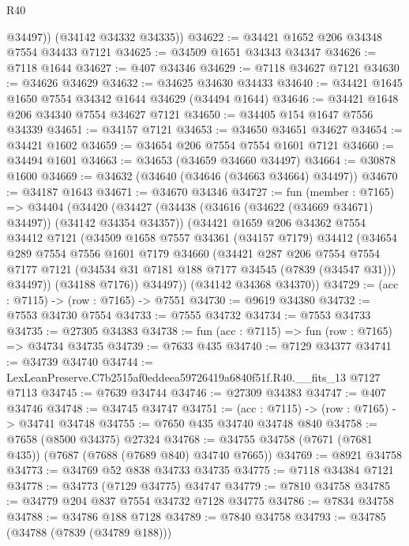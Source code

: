 \begin{lexlean}{R40}
\begin{coremodule}
          @34497))
      (@34142 @34332 @34335))
@34622 := @34421 @1652 @206 @34348 @7554 @34433 @7121
@34625 := @34509 @1651 @34343 @34347
@34626 := @7118 @1644
@34627 := @407 @34346
@34629 := @7118 @34627 @7121
@34630 := @34626 @34629
@34632 := @34625 @34630 @34433
@34640 := @34421 @1645 @1650 @7554 @34342 @1644 @34629 (@34494 @1644)
@34646 := @34421 @1648 @206 @34340 @7554 @34627 @7121
@34650 := @34405 @154 @1647 @7556 @34339
@34651 := @34157 @7121
@34653 := @34650 @34651 @34627
@34654 := @34421 @1602
@34659 := @34654 @206 @7554 @7554 @1601 @7121
@34660 := @34494 @1601
@34663 := @34653 (@34659 @34660 @34497)
@34664 := @30878 @1600
@34669 := @34632 (@34640 (@34646 (@34663 @34664) @34497))
@34670 := @34187 @1643
@34671 := @34670 @34346
@34727 := fun (member : @7165) =>
  @34404
    (@34420
      (@34427
        (@34438 (@34616 (@34622 (@34669 @34671) @34497)) (@34142 @34354 @34357))
        (@34421
          @1659
          @206
          @34362
          @7554
          @34412
          @7121
          (@34509
            @1658
            @7557
            @34361
            (@34157 @7179)
            @34412
            (@34654
              @289
              @7554
              @7556
              @1601
              @7179
              @34660
              (@34421
                @287
                @206
                @7554
                @7554
                @7177
                @7121
                (@34534 @31 @7181 @188 @7177 @34545 (@7839 (@34547 @31)))
                @34497))
            (@34188 @7176))
          @34497))
      (@34142 @34368 @34370))
@34729 := (acc : @7115) -> (row : @7165) -> @7551
@34730 := @9619 @34380
@34732 := @7553 @34730 @7554
@34733 := @7555 @34732
@34734 := @7553 @34733
@34735 := @27305 @34383
@34738 := fun (acc : @7115) => fun (row : @7165) => @34734 @34735
@34739 := @7633 @435
@34740 := @7129 @34377
@34741 := @34739 @34740
@34744 := LexLeanPreserve.C7b2515af0eddeea59726419a6840f51f.R40.__fits_13 @7127 @7113
@34745 := @7639 @34744
@34746 := @27309 @34383
@34747 := @407 @34746
@34748 := @34745 @34747
@34751 := (acc : @7115) -> (row : @7165) -> @34741 @34748
@34755 := @7650 @435 @34740 @34748 @840
@34758 := @7658 (@8500 @34375) @27324
@34768 := @34755 @34758 (@7671 (@7681 @435)) (@7687 (@7688 (@7689 @840) @34740 @7665))
@34769 := @8921 @34758
@34773 := @34769 @52 @838 @34733 @34735
@34775 := @7118 @34384 @7121
@34778 := @34773 (@7129 @34775) @34747
@34779 := @7810 @34758
@34785 := @34779 @204 @837 @7554 @34732 @7128 @34775
@34786 := @7834 @34758
@34788 := @34786 @188 @7128
@34789 := @7840 @34758
@34793 := @34785 (@34788 (@7839 (@34789 @188)))

\end{coremodule}
\end{lexlean}
